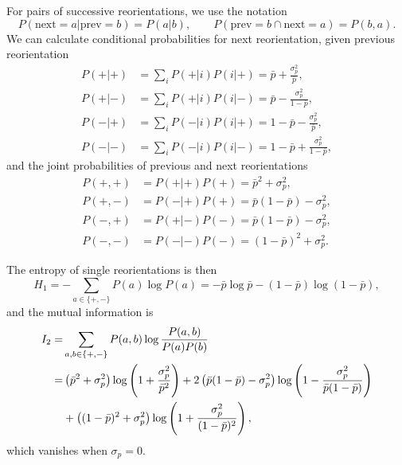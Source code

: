 \documentclass[12pt]{article}
\begin{document}
For pairs of successive reorientations, we use the notation
%
\begin{equation}\label{eq:varipairnot}
  P(\text{next}=a|\text{prev}=b) = P(a|b) , \qquad
  P(\text{prev}=b \cap \text{next}=a) = P(b,a) .
\end{equation}
%
We can calculate conditional probabilities for next reorientation, given previous reorientation
%
\begin{equation}\label{eq:varicond}
  \begin{aligned}
    P(+|+) &= \sum_i P(+|i)P(i|+) = \bar{p} + \frac{\sigma_p^2}{\bar{p}}, \\
    P(+|-) &= \sum_i P(+|i)P(i|-) = \bar{p} - \frac{\sigma_p^2}{1-\bar{p}}, \\
    P(-|+) &= \sum_i P(-|i)P(i|+) = 1-\bar{p} - \frac{\sigma_p^2}{\bar{p}}, \\
    P(-|-) &= \sum_i P(-|i)P(i|-) =1- \bar{p} + \frac{\sigma_p^2}{1-\bar{p}},
  \end{aligned}
\end{equation}
%
and the joint probabilities of previous and next reorientations
%
\begin{equation}\label{eq:varijoint}
  \begin{aligned}
    P(+,+) &= P(+|+)P(+) = \bar{p}^2 + \sigma_p^2, \\
    P(+,-) &= P(-|+)P(+) = \bar{p}(1-\bar{p}) - \sigma_p^2, \\
    P(-,+) &= P(+|-)P(-) = \bar{p}(1-\bar{p}) - \sigma_p^2, \\
    P(-,-) &= P(-|-)P(-) = (1-\bar{p})^2 + \sigma_p^2.
  \end{aligned}
\end{equation}
%

The entropy of single reorientations is then
%
\begin{equation}\label{eq:varient}
  H_1 = - \sum_{a\in\{+,-\}} P(a)\log P(a)
   = - \bar{p}\log \bar{p} - (1-\bar{p})\log(1-\bar{p}),
\end{equation}
%
and the mutual information is
%
\begin{equation}\label{eq:varimutinf}
  \begin{aligned}
  I_2 =& \sum_{a,b\in\{+,-\}} P(a,b)\log \frac{P(a,b)}{P(a)P(b)}\\
   =& \left ( \bar{p}^2 + \sigma_p^2 \right )\log\left ( 1 + \frac{\sigma_p^2}{\bar{p}^2} \right )
   + 2\left ( \bar{p}(1-\bar{p}) - \sigma_p^2 \right )\log\left ( 1 - \frac{\sigma_p^2}{\bar{p}(1-\bar{p})} \right )
   \\&+ \left ( (1-\bar{p})^2 + \sigma_p^2 \right )\log\left ( 1 + \frac{\sigma_p^2}{(1-\bar{p})^2} \right ),
  \end{aligned}
\end{equation}
%
which vanishes when $\sigma_p=0$.
\end{document}

